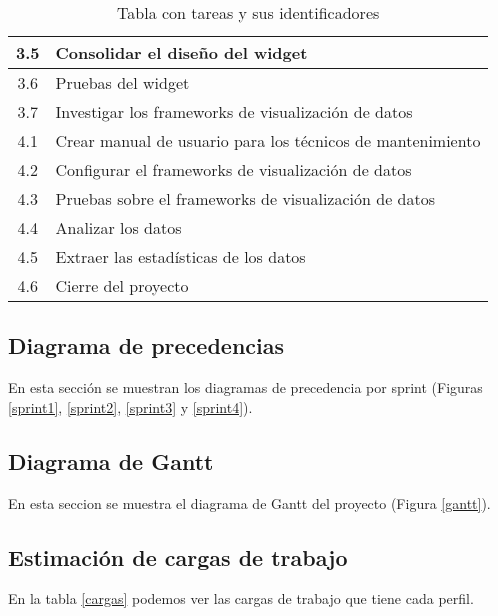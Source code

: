 \begin{table}[]
\begin{tabular}{|c|l|}
		3.5    & Consolidar el diseño del widget                                   \\ \hline
		3.6    & Pruebas del widget                                                \\ \hline
		3.7    & Investigar los frameworks de visualización de datos               \\ \hline
		4.1    & Crear manual de usuario para los técnicos de mantenimiento        \\ \hline
		4.2    & Configurar el frameworks de visualización de datos                \\ \hline
		4.3    & Pruebas sobre el frameworks de visualización de datos             \\ \hline
		4.4    & Analizar los datos                                                \\ \hline
		4.5    & Extraer las estadísticas de los datos                             \\ \hline
		4.6    & Cierre del proyecto                                               \\ \hline
	\end{tabular}
		\caption{Tabla con tareas y sus identificadores}
		\label{tbtareas}
\end{table}


\subsection{Diagrama de precedencias}
En esta sección se muestran los diagramas de precedencia por sprint (Figuras \ref{sprint1}, \ref{sprint2}, \ref{sprint3} y \ref{sprint4}).



\subsection{Diagrama de Gantt}
En esta seccion se muestra el diagrama de Gantt del proyecto (Figura \ref{gantt}).


\subsection{Estimación de cargas de trabajo}
En la tabla \ref{cargas} podemos ver las cargas de trabajo que tiene cada perfil.\\

